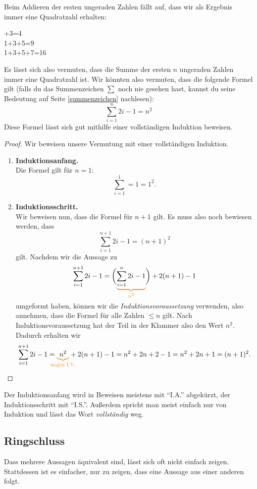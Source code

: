 \documentclass[../../main.tex]{subfiles}
\begin{document}
    \begin{example}{}
        Beim Addieren der ersten ungeraden Zahlen fällt auf, dass wir als Ergebnis immer eine Quadratzahl erhalten:
        \begin{multicols}{3}+3=4\\
            1+3+5=9\\
            1+3+5+7=16
        \end{multicols}
        Es lässt sich also vermuten, dass die Summe der ersten $n$ ungeraden Zahlen immer eine Quadratzahl ist. Wir könnten also vermuten, dass die folgende Formel gilt (falls du das Summenzeichen $\sum$ noch nie gesehen hast, kannst du seine Bedeutung auf Seite \ref{summenzeichen} nachlesen):
        \[\sum_{i=1}^n2i-1=n^2\]
        Diese Formel lässt sich gut mithilfe einer vollständigen Induktion beweisen.
        \begin{proof}
        Wir beweisen unsere Vermutung mit einer vollständigen Induktion.
        \begin{enumerate}
            \item \textbf{Induktionsanfang.}\\
                Die Formel gilt für $n=1$:
                \[\sum_{i=1}^1=1=1^2.\]
            \item \textbf{Induktionsschritt.}\\
                Wir beweisen nun, dass die Formel für $n+1$ gilt. Es muss also noch bewiesen werden, dass
                \[\sum_{i=1}^{n+1}2i-1=(n+1)^2\]
                gilt. Nachdem wir die Aussage zu
                \[\sum_{i=1}^{n+1}2i-1=\biggl(\colorbrace{\sum_{i=1}^n2i-1}{n^2}\biggr)+2(n+1)-1\]
                umgeformt haben, können wir die \emph{Induktionsvoraussetzung} verwenden, also annehmen, dass die Formel für alle Zahlen $\leq n$ gilt. Nach Induktionsvoraussetzung hat der Teil in der Klammer also den Wert $n^2$. Dadurch erhalten wir
                \[\sum_{i=1}^{n+1}2i-1=\colorbrace{n^2}{\text{wegen~I.V.}}+2(n+1)-1=n^2+2n+2-1=n^2+2n+1=(n+1)^2.\]
        \end{enumerate}
        \end{proof}
    \end{example}
    Der Induktionsanfang wird in Beweisen meistens mit \enquote{I.A.} abgekürzt, der Induktionsschritt mit \enquote{I.S.}. Außerdem spricht man meist einfach nur von Induktion und lässt das Wort \emph{vollständig} weg.
    
    \subsection*{Ringschluss}
    Dass mehrere Aussagen äquivalent sind, lässt sich oft nicht einfach zeigen. Stattdessen ist es einfacher, nur zu zeigen, dass eine Aussage aus einer anderen folgt.
\end{document}
